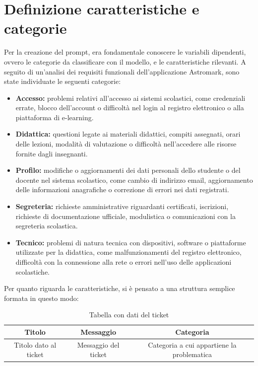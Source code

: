 \section{Definizione caratteristiche e categorie}
Per la creazione del prompt, era fondamentale conoscere le variabili dipendenti, ovvero le categorie da classificare con il modello, e le caratteristiche rilevanti. A seguito di un'analisi dei requisiti funzionali dell'applicazione Astromark, sono state individuate le seguenti categorie:
\begin{itemize}
    \item \textbf{Accesso:} problemi relativi all'accesso ai sistemi scolastici, come credenziali errate, blocco dell'account o difficoltà nel login al registro elettronico o alla piattaforma di e-learning.
    \item \textbf{Didattica:} questioni legate ai materiali didattici, compiti assegnati, orari delle lezioni, modalità di valutazione o difficoltà nell'accedere alle risorse fornite dagli insegnanti.
    \item \textbf{Profilo:} modifiche o aggiornamenti dei dati personali dello studente o del docente nel sistema scolastico, come cambio di indirizzo email, aggiornamento delle informazioni anagrafiche o correzione di errori nei dati registrati.
    \item \textbf{Segreteria:}  richieste amministrative riguardanti certificati, iscrizioni, richieste di documentazione ufficiale, modulistica o comunicazioni con la segreteria scolastica.
    \item \textbf{Tecnico:} problemi di natura tecnica con dispositivi, software o piattaforme utilizzate per la didattica, come malfunzionamenti del registro elettronico, difficoltà con la connessione alla rete o errori nell'uso delle applicazioni scolastiche.
\end{itemize}
Per quanto riguarda le caratteristiche, si è pensato a una struttura semplice formata in questo modo:
\begin{table}[h]
    \centering
    \begin{tabular}{|c|c|c|}
        \hline
        \textbf{Titolo} & \textbf{Messaggio} & \textbf{Categoria} \\
        \hline
        Titolo dato al ticket & Messaggio del ticket & Categoria a cui appartiene la problematica \\
        \hline
    \end{tabular}
    \caption{Tabella con dati del ticket}
    \label{tab:tickets}
\end{table}

